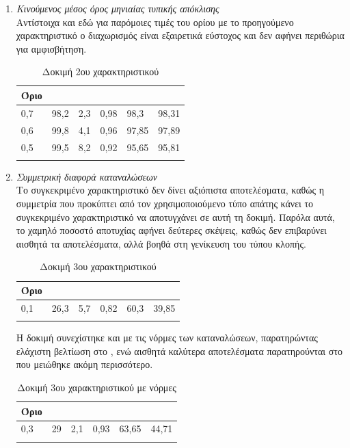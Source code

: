 \begin{enumerate}
\item{\textit{Κινούμενος μέσος όρος μηνιαίας τυπικής απόκλισης}} \\
Αντίστοιχα και εδώ για παρόμοιες τιμές του ορίου με το προηγούμενο χαρακτηριστικό ο διαχωρισμός είναι εξαιρετικά εύστοχος και δεν αφήνει περιθώρια για αμφισβήτηση.
\begin{center}
\begin{longtabu} to 0.8\textwidth { | X[c] || X[c] | X[c] | X[c] | X[c] | X[c] |  }
 \hline
  Όριο &   &  &  &  & \\
 ,7	&98,2	&2,3	&0,98	&98,3	&98,31\\
0,6	&99,8	&4,1	&0,96	&97,85	&97,89\\
0,5	&99,5	&8,2	&0,92	&95,65	&95,81\\
\hline
\caption{Δοκιμή 2ου χαρακτηριστικού}
\label{testfeat2}
\end{longtabu}
\end{center}
\item{\textit{Συμμετρική διαφορά καταναλώσεων}} \\
Το συγκεκριμένο χαρακτηριστικό δεν δίνει αξιόπιστα αποτελέσματα, καθώς η συμμετρία που προκύπτει από τον χρησιμοποιούμενο τύπο απάτης κάνει το συγκεκριμένο χαρακτηριστικό να αποτυγχάνει σε αυτή τη δοκιμή. Παρόλα αυτά, το χαμηλό ποσοστό αποτυχίας αφήνει δεύτερες σκέψεις, καθώς δεν επιβαρύνει αισθητά τα αποτελέσματα, αλλά βοηθά στη γενίκευση του τύπου κλοπής. 
\begin{center}
\begin{longtabu} to 0.8\textwidth { | X[c] || X[c] | X[c] | X[c] | X[c] | X[c] |  }
 \hline
  Όριο &   &  &  &  & \\
 ,1&	26,3&	5,7&	0,82&	60,3&	39,85\\
\hline
\caption{Δοκιμή 3ου χαρακτηριστικού}
\label{testfeat3}
\end{longtabu}
\end{center}
Η δοκιμή συνεχίστηκε και με τις νόρμες των καταναλώσεων, παρατηρώντας ελάχιστη βελτίωση στο , ενώ αισθητά καλύτερα αποτελέσματα παρατηρούνται στο  που μειώθηκε ακόμη περισσότερο.
\begin{center}
\begin{longtabu} to 0.8\textwidth { | X[c] || X[c] | X[c] | X[c] | X[c] | X[c] |  }
 \hline
  Όριο &   &  &  &  & \\
 ,3&	29&	2,1&	0,93&	63,65&	44,71\\
\hline
\caption{Δοκιμή 3ου χαρακτηριστικού με νόρμες}
\label{testfeat3norms}
\end{longtabu}
\end{center}


\end{enumerate}
